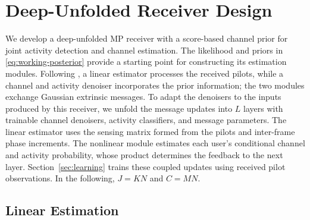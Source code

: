 \section{Deep-Unfolded Receiver Design}
\label{sec:algorithm}

We develop a deep-unfolded MP receiver with a score-based channel
prior for joint activity detection and channel estimation. The
likelihood and priors in \eqref{eq:working-posterior} provide a
starting point for constructing its estimation modules. Following
\cite{cai2026}, a linear estimator processes the received pilots,
while a channel and activity denoiser incorporates the prior
information; the two modules exchange Gaussian extrinsic messages. To adapt the denoisers to the inputs
produced by this receiver, we unfold the message updates into $L$
layers with trainable channel denoisers, activity classifiers, and
message parameters. The linear estimator uses the sensing matrix
formed from the pilots and inter-frame phase increments. The nonlinear
module estimates each user's conditional channel and activity
probability, whose product determines the feedback to the next layer.
Section~\ref{sec:learning} trains these coupled updates using received
pilot observations. In the following,
$J=KN$ and $C=MN$.

\subsection{Linear Estimation}

